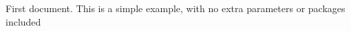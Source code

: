 \documentclass[12pt, a4paper]{article}
\begin{document}
First document. This is a simple example, with no extra parameters or packages included
\end{document}
